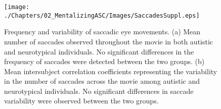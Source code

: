 \begin{figure}[!ht]
	\centering
    \texttt{[image: ./Chapters/02\_MentalizingASC/Images/SaccadesSuppl.eps]}
	\caption{Frequency and variability of saccadic eye movements. (a) Mean number of saccades observed throughout the movie in both autistic and neurotypical individuals. No significant differences in the frequency of saccades were detected between the two groups. (b) Mean intersubject correlation coefficients representing the variability in the number of saccades across the movie among autistic and neurotypical individuals. No significant differences in saccade variability were observed between the two groups.}
    \vspace*{-10pt}
	\label{fig:saccades-suppl}
\end{figure}



